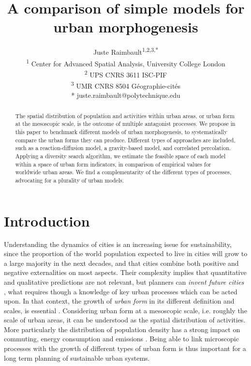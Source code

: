 \documentclass[10pt]{article}
\title{A comparison of simple models for urban morphogenesis}
\date{}
\author{
Juste Raimbault\textsuperscript{1,2,3,*}
\bigskip\\
\textsuperscript{1} Center for Advanced Spatial Analysis, University College London
\\
\textsuperscript{2} UPS CNRS 3611 ISC-PIF
\\
\textsuperscript{3} UMR CNRS 8504 G{\'e}ographie-cit{\'e}s
\bigskip\\
* juste.raimbault@polytechnique.edu
}
\begin{document}
\maketitle

\vspace{1cm}
\begin{abstract}
The spatial distribution of population and activities within urban areas, or urban form at the mesoscopic scale, is the outcome of multiple antagonist processes. We propose in this paper to benchmark different models of urban morphogenesis, to systematically compare the urban forms they can produce. Different types of approaches are included, such as a reaction-diffusion model, a gravity-based model, and correlated percolation. Applying a diversity search algorithm, we estimate the feasible space of each model within a space of urban form indicators, in comparison of empirical values for worldwide urban areas. We find a complementarity of the different types of processes, advocating for a plurality of urban models.
\end{abstract}





\section*{Introduction}


Understanding the dynamics of cities is an increasing issue for sustainability, since the proportion of the world population expected to live in cities will grow to a large majority in the next decades, and that cities combine both positive and negative externalities on most aspects. Their complexity implies that quantitative and qualitative predictions are not relevant, but planners can \emph{invent future cities} \cite{batty2018inventing}, what requires though a knowledge of key urban processes which can be acted upon. In that context, the growth of \emph{urban form} in its different definition and scales, is essential \cite{williams2000achieving}. Considering urban form at a mesoscopic scale, i.e. roughly the scale of urban areas, it can be understood as the spatial distribution of activities. More particularly the distribution of population density has a strong impact on commuting, energy consumption and emissions \cite{le2012urban}. Being able to link microscopic processes with the growth of different types of urban form is thus important for a long term planning of sustainable urban systems.
\end{document}
